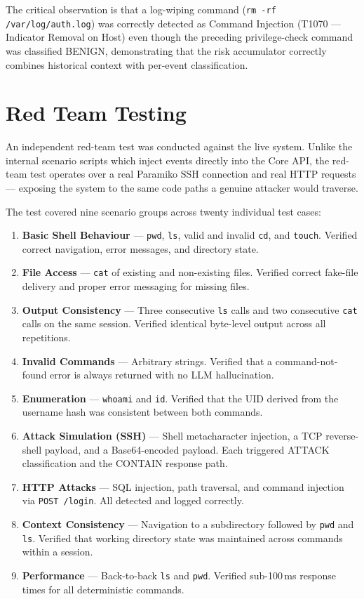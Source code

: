 The critical observation is that a log-wiping command (\texttt{rm -rf /var/log/auth.log}) was correctly detected as Command Injection (T1070 — Indicator Removal on Host) even though the preceding privilege-check command was classified BENIGN, demonstrating that the risk accumulator correctly combines historical context with per-event classification.

\section{Red Team Testing}

An independent red-team test was conducted against the live system. Unlike the internal scenario scripts which inject events directly into the Core API, the red-team test operates over a real Paramiko \ac{SSH} connection and real \ac{HTTP} requests — exposing the system to the same code paths a genuine attacker would traverse.

The test covered nine scenario groups across twenty individual test cases:

\begin{enumerate}
    \item \textbf{Basic Shell Behaviour} — \texttt{pwd}, \texttt{ls}, valid and invalid \texttt{cd}, and \texttt{touch}. Verified correct navigation, error messages, and directory state.
    \item \textbf{File Access} — \texttt{cat} of existing and non-existing files. Verified correct fake-file delivery and proper error messaging for missing files.
    \item \textbf{Output Consistency} — Three consecutive \texttt{ls} calls and two consecutive \texttt{cat} calls on the same session. Verified identical byte-level output across all repetitions.
    \item \textbf{Invalid Commands} — Arbitrary strings. Verified that a command-not-found error is always returned with no LLM hallucination.
    \item \textbf{Enumeration} — \texttt{whoami} and \texttt{id}. Verified that the UID derived from the username hash was consistent between both commands.
    \item \textbf{Attack Simulation (\ac{SSH})} — Shell metacharacter injection, a TCP reverse-shell payload, and a Base64-encoded payload. Each triggered ATTACK classification and the CONTAIN response path.
    \item \textbf{\ac{HTTP} Attacks} — \ac{SQL} injection, path traversal, and command injection via \texttt{POST /login}. All detected and logged correctly.
    \item \textbf{Context Consistency} — Navigation to a subdirectory followed by \texttt{pwd} and \texttt{ls}. Verified that working directory state was maintained across commands within a session.
    \item \textbf{Performance} — Back-to-back \texttt{ls} and \texttt{pwd}. Verified sub-100\,ms response times for all deterministic commands.
\end{enumerate}

